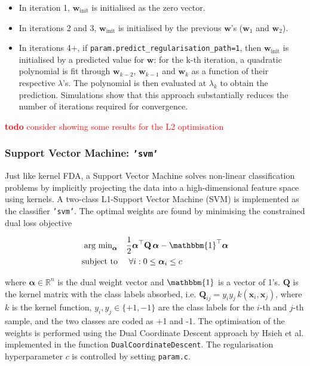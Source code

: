 \documentclass[utf8]{frontiersSCNS} %
\newcommand{\al}{\boldsymbol{\alpha}}
\newcommand{\w}{\mathbf{w}}
\newcommand{\x}{\mathbf{x}}
\newcommand{\Q}{\mathbf{Q}}
\newcommand{\R}{\mathbb{R}}
\newcommand{\ttt}[1]{\texttt{#1}}
\newcommand{\todo}[1]{\textcolor{red}{\textbf{todo} #1}}
\begin{document}
\begin{itemize}
    \item In iteration 1, $\w_\text{init}$ is initialised as the zero vector.
    \item In iterations 2 and 3, $\w_\text{init}$ is initialised by the previous $\w$'s ($\w_1$ and $\w_2$).
    \item In iterations 4+, if \ttt{param.predict\_regularisation\_path=1}, then $\w_\text{init}$ is initialised by a predicted value for $\w$: for the
  k-th iteration, a quadratic polynomial is fit through $\w_{k-2}$, $\w_{k-1}$ and $\w_k$ as a function of their respective $\lambda$'s. The polynomial is then evaluated at $\lambda_k$ to obtain the prediction. Simulations show that this approach substantially reduces the number of iterations required for convergence.
\end{itemize}{}

\todo{consider showing some results for the L2 optimisation}


\subsubsection{Support Vector Machine: \ttt{'svm'}}

Just like kernel FDA, a Support Vector Machine solves non-linear classification problems by implicitly projecting the data into a high-dimensional feature space using kernels.
A two-class L1-Support Vector Machine (SVM) is implemented as the classifier \ttt{'svm'}.
The optimal weights are found by minimising the constrained dual loss objective

\begin{align}
\begin{split}
\label{eq:svm_dual_loss_function}
\text{arg min}_{\al}\quad
& \frac{1}{2} \al^\top\Q\,\al - \mathbbm{1}^\top\al\\
\text{subject to}\quad  &\ \forall i: 0 \le \al_i \le c
\end{split}
\end{align}

where $\al\in\R^n$ is the dual weight vector and  $\mathbbm{1}$ is a vector of 1's. $\Q$ is the kernel matrix with the class labels absorbed, i.e. $\Q_{ij} = y_i y_j\, k(\x_i,\x_j)$, where $k$ is the kernel function, $y_i, y_j \in\{+1, -1\}$ are the class labels for the $i$-th and $j$-th sample, and the two classes are coded as +1 and -1. The optimisation of the weights is performed using the Dual Coordinate Descent
approach by Hsieh et al. \cite{Hsieh2008ASVM} implemented in the function \ttt{DualCoordinateDescent}. The regularisation hyperparameter $c$ is controlled by setting \ttt{param.c}.
\end{document}
